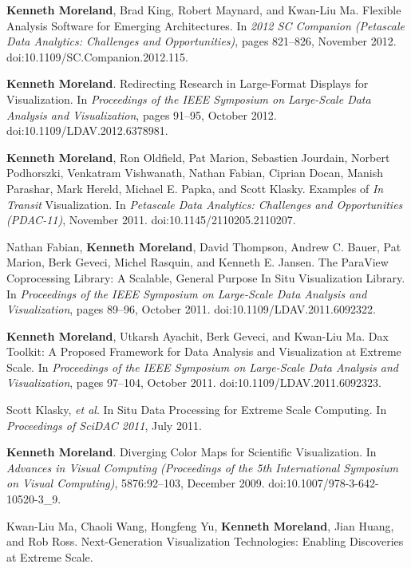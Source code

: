 \begin{enumerate}[label={[\arabic*]}, left=0pt]
  \textbf{Kenneth Moreland}, Brad King, Robert Maynard, and Kwan-Liu Ma.
  Flexible Analysis Software for Emerging Architectures.
  In \emph{2012 SC Companion (Petascale Data Analytics: Challenges and Opportunities)}, pages 821--826, November 2012.
  doi:10.1109/SC.Companion.2012.115.
\item  %
  \textbf{Kenneth Moreland}.
  Redirecting Research in Large-Format Displays for Visualization.
  In \emph{Proceedings of the IEEE Symposium on Large-Scale Data Analysis and Visualization}, pages 91--95, October 2012.
  doi:10.1109/LDAV.2012.6378981.
\item  %
  \textbf{Kenneth Moreland}, Ron Oldfield, Pat Marion, Sebastien Jourdain, Norbert Podhorszki, Venkatram Vishwanath, Nathan Fabian, Ciprian Docan, Manish Parashar, Mark Hereld, Michael E. Papka, and Scott Klasky.
  Examples of {\it In Transit} Visualization.
  In \emph{Petascale Data Analytics: Challenges and Opportunities (PDAC-11)}, November 2011.
  doi:10.1145/2110205.2110207.
\item  %
  Nathan Fabian, \textbf{Kenneth Moreland}, David Thompson, Andrew C. Bauer, Pat Marion, Berk Geveci, Michel Rasquin, and Kenneth E. Jansen.
  The {ParaView} Coprocessing Library: A Scalable, General Purpose In Situ Visualization Library.
  In \emph{Proceedings of the IEEE Symposium on Large-Scale Data Analysis and Visualization}, pages 89--96, October 2011.
  doi:10.1109/LDAV.2011.6092322.
\item  %
  \textbf{Kenneth Moreland}, Utkarsh Ayachit, Berk Geveci, and Kwan-Liu Ma.
  Dax Toolkit: A Proposed Framework for Data Analysis and Visualization at Extreme Scale.
  In \emph{Proceedings of the IEEE Symposium on Large-Scale Data Analysis and Visualization}, pages 97--104, October 2011.
  doi:10.1109/LDAV.2011.6092323.
\item  %
  Scott Klasky, \emph{et al}.
  In Situ Data Processing for Extreme Scale Computing.
  In \emph{Proceedings of SciDAC 2011}, July 2011.
\item  %
  \textbf{Kenneth Moreland}.
  Diverging Color Maps for Scientific Visualization.
  In \emph{Advances in Visual Computing (Proceedings of the 5th International Symposium on Visual Computing)}, 5876:92--103, December 2009.
  doi:10.1007/978-3-642-10520-3\_9.
\item  %
  Kwan-Liu Ma, Chaoli Wang, Hongfeng Yu, \textbf{Kenneth Moreland}, Jian Huang, and Rob Ross.
  Next-Generation Visualization Technologies: Enabling Discoveries at Extreme Scale.

\end{enumerate}
